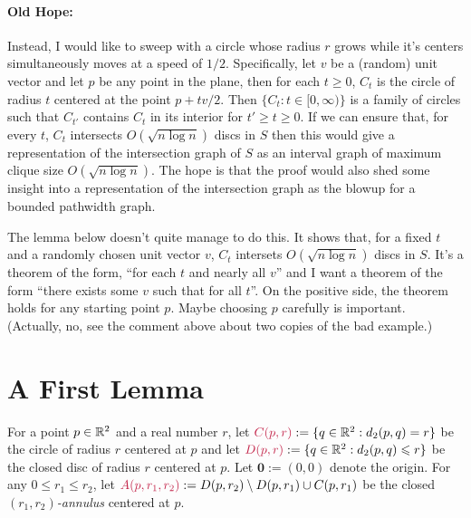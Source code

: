 \documentclass{patmorin}
\makeatletter
\renewcommand{\ge}{\geqslant}
\renewcommand{\le}{\leqslant}
\newcommand{\defin}[1]{\emph{\textcolor{brightmaroon}{#1}}}
\def\mathcolor#1#{\@mathcolor{#1}}
\def\@mathcolor#1#2#3{%
  \protect\leavevmode
  \begingroup
    \color#1{#2}#3%
  \endgroup
}
\newcommand{\mathdefin}[1]{\mathcolor{brightmaroon}{#1}}
\makeatother
\begin{document}
\paragraph{Old Hope:}

Instead, I would like to sweep with a circle whose radius $r$ grows while it's centers simultaneously moves at a speed of $1/2$.  Specifically, let $v$ be a (random) unit vector and let $p$ be any point in the plane, then for each $t\ge 0$, $C_t$ is the circle of radius $t$ centered at the point $p+tv/2$. Then $\{C_t: t\in[0,\infty)\}$ is a family of circles such that $C_{t'}$ contains $C_t$ in its interior for $t'\ge t\ge 0$.  If we can ensure that, for every $t$, $C_t$ intersects $O(\sqrt{n\log n})$ discs in $S$ then this would give a representation of the intersection graph of $S$ as an interval graph of maximum clique size $O(\sqrt{n\log n})$.  The hope is that the proof would also shed some insight into a representation of the intersection graph as the blowup for a bounded pathwidth graph.

The lemma below doesn't quite manage to do this.  It shows that, for a fixed $t$ and a randomly chosen unit vector $v$, $C_t$ intersets $O(\sqrt{n\log n})$ discs in $S$.  It's a theorem of the form, ``for each $t$ and nearly all $v$'' and I want a theorem of the form ``there exists some $v$ such that for all $t$''.  On the positive side, the theorem holds for any starting point $p$.  Maybe choosing $p$ carefully is important.  (Actually, no, see the comment above about two copies of the bad example.)



\section{A First Lemma}

For a point $p\in\mathbb{R}^2$ and a real number $r$, let $\mathdefin{C(p,r)}:=\{q\in\R^2: d_2(p,q)=r\}$ be the circle of radius $r$ centered at $p$ and let $\mathdefin{D(p,r)}:=\{q\in\R^2: d_2(p,q)\le r\}$ be the closed disc of radius $r$ centered at $p$.  Let $\mathbf{0}:=(0,0)$ denote the origin.  For any $0\le r_1\le r_2$, let $\mathdefin{A(p,r_1,r_2)}:=D(p,r_2)\setminus D(p,r_1)\cup C(p,r_1)$ be the closed \defin{$(r_1,r_2)$-annulus} centered at $p$.
\end{document}

